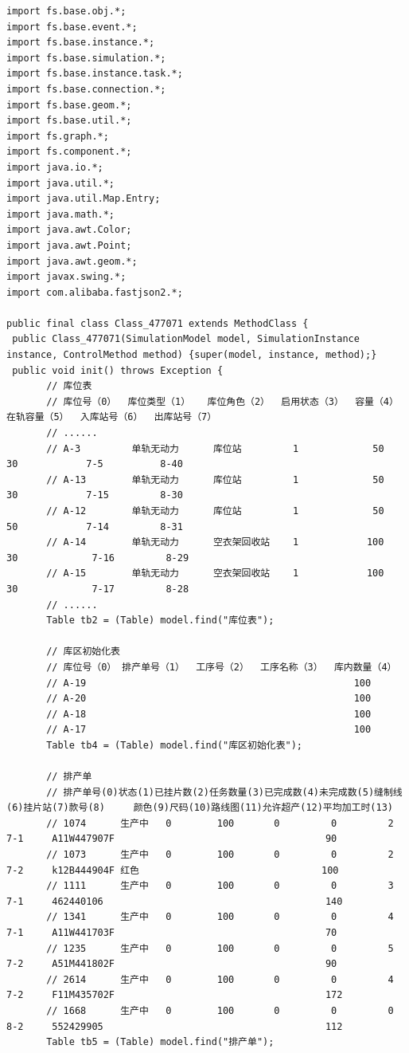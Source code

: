 \begin{lstlisting}
import fs.base.obj.*;
import fs.base.event.*;
import fs.base.instance.*;
import fs.base.simulation.*;
import fs.base.instance.task.*;
import fs.base.connection.*;
import fs.base.geom.*;
import fs.base.util.*;
import fs.graph.*;
import fs.component.*;
import java.io.*;
import java.util.*;
import java.util.Map.Entry;
import java.math.*;
import java.awt.Color;
import java.awt.Point;
import java.awt.geom.*;
import javax.swing.*;
import com.alibaba.fastjson2.*;

public final class Class_477071 extends MethodClass {
 public Class_477071(SimulationModel model, SimulationInstance instance, ControlMethod method) {super(model, instance, method);}
 public void init() throws Exception {
   	   // 库位表
       // 库位号（0）  库位类型（1）   库位角色（2）  启用状态（3）  容量（4） 在轨容量（5）  入库站号（6）  出库站号（7）
       // ......
       // A-3         单轨无动力      库位站         1             50       30            7-5          8-40
       // A-13        单轨无动力      库位站         1             50       30            7-15         8-30
       // A-12        单轨无动力      库位站         1             50       50            7-14         8-31
       // A-14        单轨无动力      空衣架回收站    1            100      30             7-16         8-29
       // A-15        单轨无动力      空衣架回收站    1            100      30             7-17         8-28
       // ......
       Table tb2 = (Table) model.find("库位表");
       
       // 库区初始化表
       // 库位号（0） 排产单号（1）  工序号（2）  工序名称（3）  库内数量（4）
       // A-19                                               100
       // A-20                                               100
       // A-18                                               100
       // A-17                                               100
       Table tb4 = (Table) model.find("库区初始化表");
       
       // 排产单
       // 排产单号(0)状态(1)已挂片数(2)任务数量(3)已完成数(4)未完成数(5)缝制线(6)挂片站(7)款号(8)     颜色(9)尺码(10)路线图(11)允许超产(12)平均加工时(13)
       // 1074      生产中   0        100       0         0         2        7-1     A11W447907F                                     90
       // 1073      生产中   0        100       0         0         2        7-2     k12B444904F 红色                                100
       // 1111      生产中   0        100       0         0         3        7-1     462440106                                       140
       // 1341      生产中   0        100       0         0         4        7-1     A11W441703F                                     70
       // 1235      生产中   0        100       0         0         5        7-2     A51M441802F                                     90
       // 2614      生产中   0        100       0         0         4        7-2     F11M435702F                                     172
       // 1668      生产中   0        100       0         0         0        8-2     552429905                                       112
       Table tb5 = (Table) model.find("排产单");
       

\end{lstlisting}
